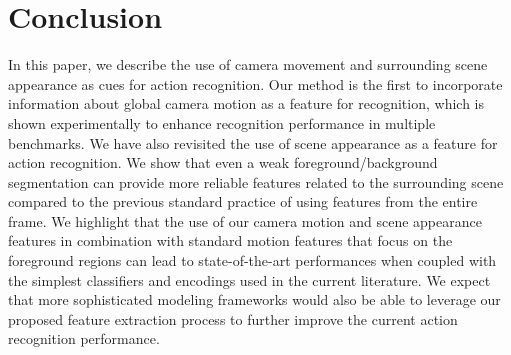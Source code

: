 \section{Conclusion}
\label{conclusion}

In this paper, we describe the use of camera movement and surrounding scene appearance as cues for action recognition.
Our method is the first to incorporate information about global camera motion as a feature for recognition,
which is shown experimentally to enhance recognition performance in multiple benchmarks. We have also
revisited the use of scene appearance as a feature for action recognition. We show that even a weak foreground/background
segmentation can provide more reliable features related to the surrounding scene compared to the previous
standard practice of using features from the entire frame. We highlight that the use of our camera motion and scene appearance
features in combination with standard motion features that focus on the foreground regions
can lead to state-of-the-art performances when coupled with the simplest classifiers
and encodings used in the current literature.
We expect that more sophisticated modeling frameworks would also be able to leverage our proposed feature extraction
process to further improve the current action recognition performance.
